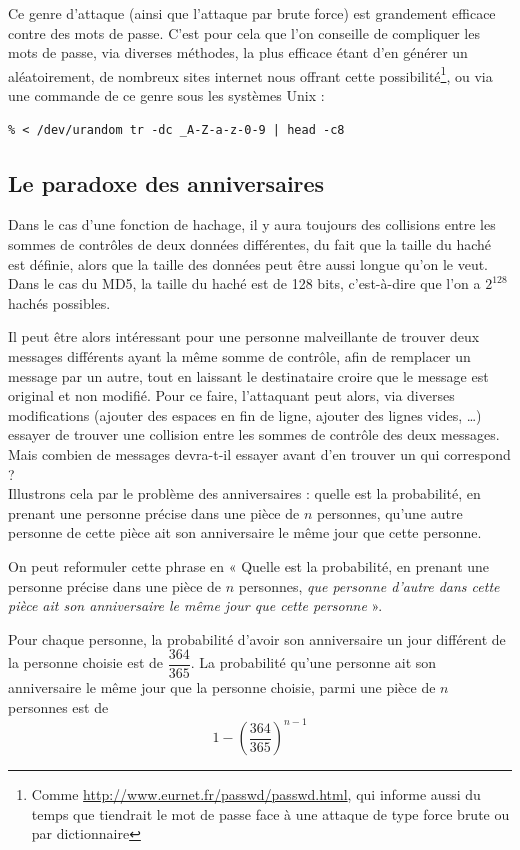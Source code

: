 Ce genre d'attaque (ainsi que l'attaque par brute force)
est grandement efficace contre des mots de passe. C'est
pour cela que l'on conseille de compliquer les mots de passe, via
diverses méthodes, la plus efficace étant d'en générer un
aléatoirement, de nombreux sites internet nous offrant cette
possibilité\footnote{Comme
\url{http://www.eurnet.fr/passwd/passwd.html}, qui informe aussi
du temps que tiendrait le mot de passe face à une attaque de type
force brute ou par dictionnaire}, ou via une commande de ce genre sous les systèmes
Unix :
\lstset{language=bash}
\begin{lstlisting}
% < /dev/urandom tr -dc _A-Z-a-z-0-9 | head -c8 
\end{lstlisting}

\subsection{Le paradoxe des anniversaires}
Dans le cas d'une fonction de hachage, il y aura toujours des
collisions entre les sommes de contrôles de deux données
différentes, du fait que la taille du haché est définie, alors que
la taille des données peut être aussi longue qu'on le veut.
Dans le cas du MD5, la taille du haché est de 128 bits,
c'est-à-dire que l'on a $2^{128}$ hachés possibles.

Il peut être alors intéressant pour une personne malveillante de
trouver deux messages différents ayant la même somme de contrôle,
afin de remplacer un message par un autre, tout en laissant le
destinataire croire que le message est original et non modifié. Pour ce
faire, l'attaquant peut alors, via diverses modifications (ajouter
des espaces en fin de ligne, ajouter des lignes vides, …) essayer
de trouver une collision entre les sommes de contrôle des deux
messages. Mais combien de messages devra-t-il essayer avant d'en
trouver un qui correspond ?
\\

Illustrons cela par le problème des anniversaires : quelle est la
probabilité, en prenant une personne précise dans une pièce de $n$
personnes, qu'une autre personne de cette pièce ait son
anniversaire le même jour que cette personne.

On peut reformuler cette phrase en « Quelle est la probabilité, en
prenant une personne précise dans une pièce de $n$ personnes,
\emph{que personne d'autre dans cette pièce ait son anniversaire
le même jour que cette personne} ».

Pour chaque personne, la probabilité d'avoir son anniversaire un
jour différent de la personne choisie est de $\dfrac{364}{365}$.
La probabilité qu'une personne ait son anniversaire le même jour
que la personne choisie, parmi une pièce de $n$ personnes est de
\[ 1 - \left(\dfrac{364}{365}\right)^{n-1} \]

